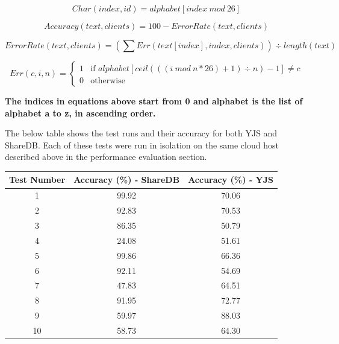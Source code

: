 \documentclass[9pt, titlepage]{article}
\begin{document}
  \begin{equation} \label{simple_insertion_algorithm_character}
    Char(index, id) = alphabet[index\ mod\ 26]
  \end{equation}

  \begin{equation} \label{overall_accuracy_measure}
    Accuracy(text, clients) = 100 - ErrorRate(text, clients)
  \end{equation}

  \begin{equation} \label{overall_accuracy_measure}
    ErrorRate(text, clients) = (\sum Err(text[index], index, clients)) \div length(text)
  \end{equation}

  \begin{equation} \label{error_calculation}
    Err(c, i, n) = 
    \left\{
	    \begin{array}{ll}
        1 & \mbox{if } alphabet[ceil(((i\ mod\ n * 26) + 1) \div n)-1] \neq c \\
        0 & \mbox{otherwise }
	    \end{array}
    \right.
  \end{equation}

  \textbf{The indices in equations above start from 0 and alphabet is the list of alphabet a to z, in ascending order.}
  
  The below table shows the test runs and their accuracy for both YJS and ShareDB. Each of these tests were run in isolation on
  the same cloud host described above in the performance evaluation section.\\

  \begin{center}
    \begin{tabular}{||c c c||} 
      \hline
      Test Number & Accuracy (\%) - ShareDB & Accuracy (\%) - YJS \\ [0.5ex] 
      \hline\hline
      1 & 99.92 & 70.06 \\ 
      \hline
      2 & 92.83 & 70.53 \\
      \hline
      3 & 86.35 & 50.79 \\
      \hline
      4 & 24.08 & 51.61 \\
      \hline
      5 & 99.86 & 66.36 \\
      \hline
      6 & 92.11 & 54.69 \\
      \hline
      7 & 47.83 & 64.51 \\
      \hline
      8 & 91.95 & 72.77 \\
      \hline
      9 & 59.97 & 88.03 \\
      \hline
      10 & 58.73 & 64.30 \\
      \hline
    \end{tabular}
  \end{center}
  
\end{document}
